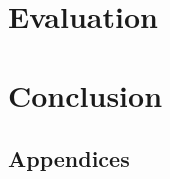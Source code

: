\documentclass{l4proj}
\begin{document}
\chapter{Evaluation} 

\chapter{Conclusion}    

%
% 

\begin{appendices}

\chapter{Appendices}

\end{appendices}






\end{document}
